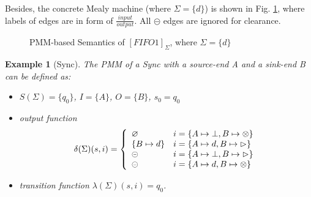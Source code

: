 \documentclass[conference, a4paper]{IEEEtran}
\newtheorem{example}{Example}
\newcommand{\rblock}[0]{\circleddash}
\newcommand{\rread}[0]{\rhd}
\newcommand{\rnoread}[0]{\otimes}
\newcommand{\smap}[1]{[{#1}]}
\newcommand{\rempty}[0]{\varnothing}
\begin{document}
Besides, the concrete Mealy machine (where $\Sigma=\{d\}$) is shown in Fig. \ref{fig:pmmfifo},
where labels of edges are in form of $\frac{input}{output}$. All $\rblock$ edges are ignored for
clearance.
\begin{figure}[ht]
  \begin{center}
    
  \end{center}
  \caption{PMM-based Semantics of $\smap{FIFO1}_\Sigma$, where $\Sigma=\{d\}$}
  \label{fig:pmmfifo}
\end{figure}

\begin{example}[Sync]
  The PMM of a Sync with a source-end A and a sink-end B can be defined as:
  \begin{itemize}
    \item[-] $S(\Sigma)=\{q_0\}$, $I=\{A\}$, $O=\{B\}$, $s_0=q_0$
    \item[-] output function
      \begin{displaymath}
        \delta(\Sigma)(s,i)=\left\{
        \begin{array}[ht]{ll}
          \rempty & i=\{A\mapsto\bot,B\mapsto\rnoread\} \\
          \{B\mapsto d\} & i=\{A\mapsto d,B\mapsto\rread\}\\
          \rblock & i=\{A\mapsto\bot,B\mapsto\rread\} \\
          \rblock & i=\{A\mapsto d,B\mapsto\rnoread\} \\
        \end{array}
        \right.
      \end{displaymath}
    \item[-] transition function $\lambda(\Sigma)(s,i)=q_0$.
  \end{itemize}
\end{example}
\end{document}
